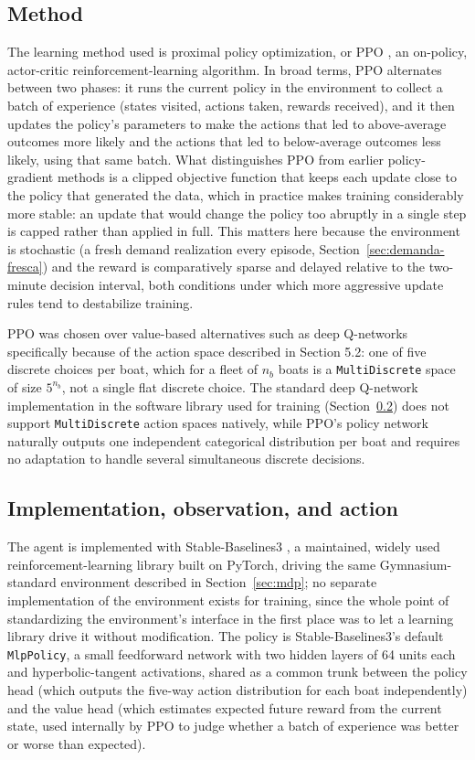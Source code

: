 \documentclass[11pt,a4paper]{article}
\begin{document}
\subsection{Method}

The learning method used is proximal policy optimization, or PPO \citep{Schulman2017}, an on-policy, actor-critic reinforcement-learning algorithm. In broad terms, PPO alternates between two phases: it runs the current policy in the environment to collect a batch of experience (states visited, actions taken, rewards received), and it then updates the policy's parameters to make the actions that led to above-average outcomes more likely and the actions that led to below-average outcomes less likely, using that same batch. What distinguishes PPO from earlier policy-gradient methods is a clipped objective function that keeps each update close to the policy that generated the data, which in practice makes training considerably more stable: an update that would change the policy too abruptly in a single step is capped rather than applied in full. This matters here because the environment is stochastic (a fresh demand realization every episode, Section~\ref{sec:demanda-fresca}) and the reward is comparatively sparse and delayed relative to the two-minute decision interval, both conditions under which more aggressive update rules tend to destabilize training.

PPO was chosen over value-based alternatives such as deep Q-networks specifically because of the action space described in Section 5.2: one of five discrete choices per boat, which for a fleet of $n_b$ boats is a \texttt{MultiDiscrete} space of size $5^{n_b}$, not a single flat discrete choice. The standard deep Q-network implementation in the software library used for training (Section~\ref{sec:implementacion}) does not support \texttt{MultiDiscrete} action spaces natively, while PPO's policy network naturally outputs one independent categorical distribution per boat and requires no adaptation to handle several simultaneous discrete decisions.

\subsection{Implementation, observation, and action}
\label{sec:implementacion}

The agent is implemented with Stable-Baselines3 \citep{Raffin2021}, a maintained, widely used reinforcement-learning library built on PyTorch, driving the same Gymnasium-standard environment \citep{Brockman2016} described in Section~\ref{sec:mdp}; no separate implementation of the environment exists for training, since the whole point of standardizing the environment's interface in the first place was to let a learning library drive it without modification. The policy is Stable-Baselines3's default \texttt{MlpPolicy}, a small feedforward network with two hidden layers of 64 units each and hyperbolic-tangent activations, shared as a common trunk between the policy head (which outputs the five-way action distribution for each boat independently) and the value head (which estimates expected future reward from the current state, used internally by PPO to judge whether a batch of experience was better or worse than expected).
\end{document}
